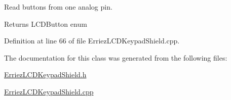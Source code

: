 Read buttons from one analog pin. 

\begin{DoxyReturn}{Returns}
L\+C\+D\+Button enum 
\end{DoxyReturn}


Definition at line 66 of file Erriez\+L\+C\+D\+Keypad\+Shield.\+cpp.



The documentation for this class was generated from the following files\+:\begin{DoxyCompactItemize}
\item 
\hyperlink{_erriez_l_c_d_keypad_shield_8h}{Erriez\+L\+C\+D\+Keypad\+Shield.\+h}\item 
\hyperlink{_erriez_l_c_d_keypad_shield_8cpp}{Erriez\+L\+C\+D\+Keypad\+Shield.\+cpp}\end{DoxyCompactItemize}

